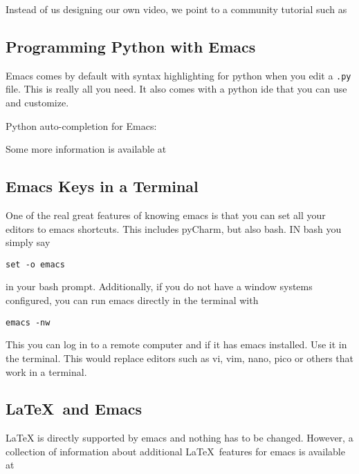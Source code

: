 Instead of us designing our own video, we point to a community
tutorial such as



\subsection{Programming Python with Emacs}

Emacs comes by default with syntax highlighting for python when you
edit a \verb|.py| file. This is really all you need. It also comes with a
python ide that you can use and customize.

Python auto-completion for Emacs:



Some more information is available at


\subsection{Emacs Keys in a Terminal}

One of the real great features of knowing emacs is that you can set
all your editors to emacs shortcuts. This includes pyCharm, but also
bash. IN bash you simply say 

\begin{verbatim}
set -o emacs
\end{verbatim}

in your bash prompt. Additionally, if you do not have a window systems
configured, you can run emacs directly in the terminal with 

\begin{verbatim}
emacs -nw
\end{verbatim}

This you can log in to a remote computer and if it has emacs
installed. Use it in the terminal. This would replace editors such as
vi, vim, nano, pico or others that work in a terminal.

\subsection{\LaTeX~and Emacs}

LaTeX is directly supported by emacs and nothing has to be
changed. However, a collection of information about additional
\LaTeX~features for emacs is available at

